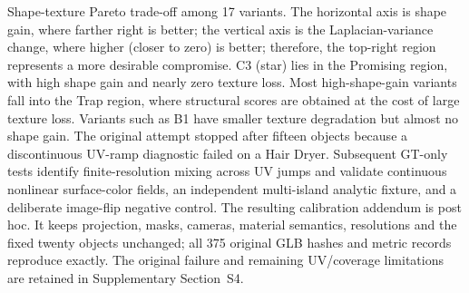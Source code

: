 \documentclass[times,twocolumn,final]{elsarticle}
\providecommand{\DIFadd}[1]{{\protect\color{blue} \sf #1}} %
\providecommand{\DIFdel}[1]{{\protect\color{red} \scriptsize #1}} %
\providecommand{\DIFaddbegin}{} %
\providecommand{\DIFaddend}{} %
\providecommand{\DIFdelbegin}{} %
\providecommand{\DIFdelend}{} %
\providecommand{\DIFdelFL}[1]{\DIFdel{#1}} %
\begin{document}
\DIFdelbegin %
{%
\DIFdelFL{Shape-texture Pareto trade-off among 17 variants. The horizontal axis is shape gain, where farther right is better; the vertical axis is the Laplacian-variance change, where higher (closer to zero) is better; therefore, the top-right region represents a more desirable compromise. C3 (star) lies in the Promising region, with high shape gain and nearly zero texture loss. Most high-shape-gain variants fall into the Trap region, where structural scores are obtained at the cost of large texture loss. Variants such as B1 have smaller texture degradation but almost no shape gain.}}
\DIFdelend \DIFaddbegin \DIFadd{The original attempt stopped after fifteen objects because a discontinuous UV-ramp diagnostic failed on a Hair Dryer. Subsequent GT-only tests identify finite-resolution mixing across UV jumps and validate continuous nonlinear surface-color fields, an independent multi-island analytic fixture, and a deliberate image-flip negative control. The resulting calibration addendum is post hoc. It keeps projection, masks, cameras, material semantics, resolutions and the fixed twenty objects unchanged; all 375 original GLB hashes and metric records reproduce exactly. The original failure and remaining UV/coverage limitations are retained in Supplementary Section~S4.
}\DIFaddend 
\end{document}
